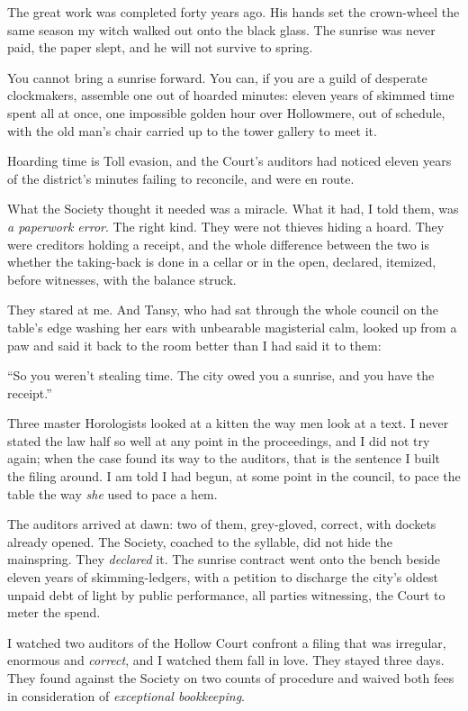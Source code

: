 The great work was completed forty years ago. His hands set the crown-wheel the same season my witch walked out onto the black glass. The sunrise was never paid, the paper slept, and he will not survive to spring.

You cannot bring a sunrise forward. You can, if you are a guild of desperate clockmakers, assemble one out of hoarded minutes: eleven years of skimmed time spent all at once, one impossible golden hour over Hollowmere, out of schedule, with the old man's chair carried up to the tower gallery to meet it.

Hoarding time is Toll evasion, and the Court's auditors had noticed eleven years of the district's minutes failing to reconcile, and were en route.

What the Society thought it needed was a miracle. What it had, I told them, was \emph{a paperwork error}. The right kind. They were not thieves hiding a hoard. They were creditors holding a receipt, and the whole difference between the two is whether the taking-back is done in a cellar or in the open, declared, itemized, before witnesses, with the balance struck.

They stared at me. And Tansy, who had sat through the whole council on the table's edge washing her ears with unbearable magisterial calm, looked up from a paw and said it back to the room better than I had said it to them:

``So you weren't stealing time. The city owed you a sunrise, and you have the receipt.''

Three master Horologists looked at a kitten the way men look at a text. I never stated the law half so well at any point in the proceedings, and I did not try again; when the case found its way to the auditors, that is the sentence I built the filing around. I am told I had begun, at some point in the council, to pace the table the way \emph{she} used to pace a hem.

The auditors arrived at dawn: two of them, grey-gloved, correct, with dockets already opened. The Society, coached to the syllable, did not hide the mainspring. They \emph{declared} it. The sunrise contract went onto the bench beside eleven years of skimming-ledgers, with a petition to discharge the city's oldest unpaid debt of light by public performance, all parties witnessing, the Court to meter the spend.

I watched two auditors of the Hollow Court confront a filing that was irregular, enormous and \emph{correct}, and I watched them fall in love. They stayed three days. They found against the Society on two counts of procedure and waived both fees in consideration of \emph{exceptional bookkeeping}.

